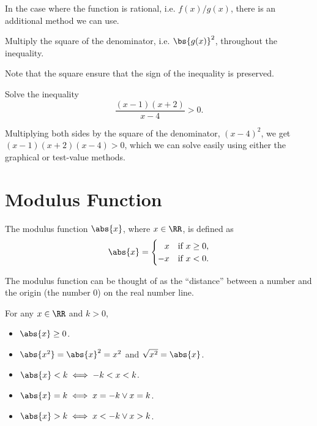 In the case where the function is rational, i.e. $f(x)/g(x)$, there is an additional method we can use.
\begin{recipe}
    Multiply the square of the denominator, i.e. $\bs{g(x)}^2$, throughout the inequality.
\end{recipe}
Note that the square ensure that the sign of the inequality is preserved.

\begin{sample}
    Solve the inequality \[\frac{(x-1)(x + 2)}{x - 4} > 0.\]
\end{sample}
\begin{sampans}
    Multiplying both sides by the square of the denominator, $(x-4)^2$, we get $(x-1)(x+2)(x-4) > 0$, which we can solve easily using either the graphical or test-value methods.
\end{sampans}

\section{Modulus Function}

\begin{definition}
    The modulus function $\abs{x}$, where $x \in \RR$, is defined as \[\abs{x} = \begin{cases}
        \phantom{-}x & \text{if $x \geq 0$,}\\
        -x & \text{if $x < 0$.}
    \end{cases}\]
\end{definition}

The modulus function can be thought of as the ``distance'' between a number and the origin (the number 0) on the real number line.

\begin{fact}
    For any $x \in \RR$ and $k > 0$,
    \begin{itemize}
        \item $\abs{x} \geq 0$.
        \item $\abs{x^2} = \abs{x}^2 = x^2$ and $\sqrt{x^2} = \abs{x}$.
        \item $\abs{x} < k \iff -k < x < k$.
        \item $\abs{x} = k \iff x = -k \lor x = k$.
        \item $\abs{x} > k \iff x < -k \lor x > k$.
    \end{itemize}
\end{fact}